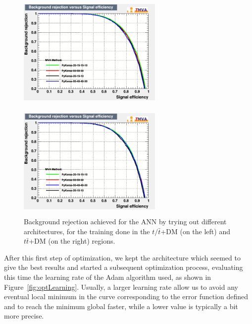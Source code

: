 \documentclass[a4paper, 10pt, openright]{report}
\begin{document}
\begin{appendices}
\begin{figure}[htbp]
\centering
\begin{minipage}[b]{.48\textwidth}
\includegraphics[width=7cm, height=5.7cm]{figs/ANN_arch_ST.png}
\end{minipage}\hfill
\begin{minipage}[b]{.48\textwidth}
\includegraphics[width=7cm, height=5.7cm]{figs/ANN_arch_TTbar.png}
\end{minipage} \hfill
\caption{Background rejection achieved for the \ac{ANN} by trying out different architectures, for the training done in the $t/ \bar t$+DM (on the left) and $t \bar t$+DM (on the right) regions.}
\label{fig:optLayers}
\end{figure}

After this first step of optimization, we kept the architecture which seemed to give the best results and started a subsequent optimization process, evaluating this time the learning rate of the Adam algorithm used, as shown in Figure~\ref{fig:optLearning}. Usually, a larger learning rate allow us to avoid any eventual local minimum in the curve corresponding to the error function defined and to reach the minimum global faster, while a lower value is typically a bit more precise. %


\end{appendices}
\end{document}
